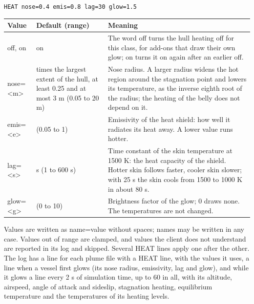 \documentclass[Orbiter Developer Manual.tex]{subfiles}
\begin{document}
\begin{sloppypar}
\begin{lstlisting}[language=OSFS]
HEAT nose=0.4 emis=0.8 lag=30 glow=1.5
\end{lstlisting}

	\begin{longtable}{ |p{}|>{\raggedright\arraybackslash}p{}|>{\raggedright\arraybackslash}p{}| }
	\hline\rule{0pt}{2ex}
	\textbf{Value} & \textbf{Default (range)} & \textbf{Meaning}\\
	\hline\rule{0pt}{2ex}
	off, on & on & The word off turns the hull heating off for this class, for add-ons that draw their own glow; on turns it on again after an earlier off.\\
	\hline\rule{0pt}{2ex}
	nose=<m> & 0.03 times the largest extent of the hull, at least 0.25 and at most 3 m (0.05 to 20 m) & Nose radius. A larger radius widens the hot region around the stagnation point and lowers its temperature, as the inverse eighth root of the radius; the heating of the belly does not depend on it.\\
	\hline\rule{0pt}{2ex}
	emis=<e> & 0.85 (0.05 to 1) & Emissivity of the heat shield: how well it radiates its heat away. A lower value runs hotter.\\
	\hline\rule{0pt}{2ex}
	lag=<s> & 25 s (1 to 600 s) & Time constant of the skin temperature at 1500 K: the heat capacity of the shield. Hotter skin follows faster, cooler skin slower; with 25 s the skin cools from 1500 to 1000 K in about 80 s.\\
	\hline\rule{0pt}{2ex}
	glow=<g> & 1 (0 to 10) & Brightness factor of the glow; 0 draws none. The temperatures are not changed.\\
	\hline
	\end{longtable}

\noindent
Values are written as name=value without spaces; names may be written in any case. Values out of range are clamped, and values the client does not understand are reported in its log and skipped. Several HEAT lines apply one after the other. The log has a line for each plume file with a HEAT line, with the values it uses, a line when a vessel first glows (its nose radius, emissivity, lag and glow), and while it glows a line every 2 s of simulation time, up to 60 in all, with its altitude, airspeed, angle of attack and sideslip, stagnation heating, equilibrium temperature and the temperatures of its heating levels.



\end{sloppypar}
\end{document}
